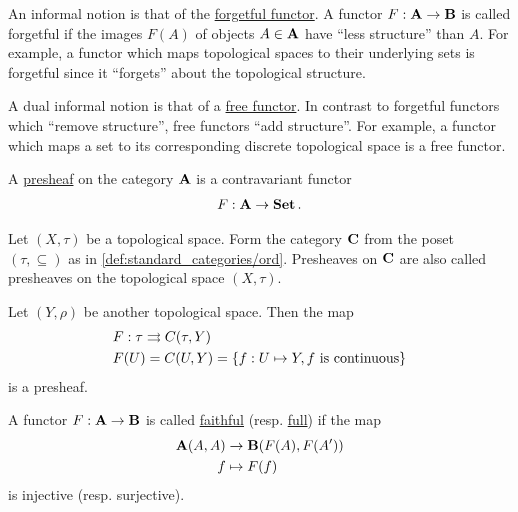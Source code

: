 \begin{note}\label{note:forgetful_free_functor}\cite[examples 1.2.3, 1.2.4]{Leinster2014}
  An informal notion is that of the \uline{forgetful functor}. A functor $F: \operatorname{\mathbf{A}} \to \operatorname{\mathbf{B}}$ is called forgetful if the images $F(A)$ of objects $A \in \operatorname{\mathbf{A}}$ have \enquote{less structure} than $A$. For example, a functor which maps topological spaces to their underlying sets is forgetful since it \enquote{forgets} about the topological structure.

  A dual informal notion is that of a \uline{free functor}. In contrast to forgetful functors which \enquote{remove structure}, free functors \enquote{add structure}. For example, a functor which maps a set to its corresponding discrete topological space is a free functor.
\end{note}

\begin{definition}\label{def:presheaf}\cite[definition 1.2.15]{Leinster2014}
  A \uline{presheaf} on the category $\operatorname{\mathbf{A}}$ is a contravariant functor
  \begin{align*}
    F: \operatorname{\mathbf{A}} \to \operatorname{\mathbf{Set}}.
  \end{align*}
\end{definition}

\begin{example}\label{ex:topological_space_presheaf}\cite[24]{Leinster2014}
  Let $(X, \tau)$ be a topological space. Form the category $\operatorname{\mathbf{C}}$ from the poset $(\tau, \subseteq)$ as in \cref{def:standard_categories/ord}. Presheaves on $\operatorname{\mathbf{C}}$ are also called presheaves on the topological space $(X, \tau)$.

  Let $(Y, \rho)$ be another topological space. Then the map
  \begin{align*}
    &F: \tau \rightrightarrows C(\tau, Y) \\
    &F(U) = C(U, Y) = \{ f: U \mapsto Y, f \text{ is continuous} \}
  \end{align*}
  is a presheaf.
\end{example}

\begin{definition}\label{def:faithful_full_functors}\cite[definition 1.2.16]{Leinster2014}
  A functor $F: \operatorname{\mathbf{A}} \to \operatorname{\mathbf{B}}$ is called \uline{faithful} (resp. \uline{full}) if the map
  \begin{align*}
    \operatorname{\mathbf{A}}(A, A) &\to \operatorname{\mathbf{B}}(F(A), F(A')) \\
    f &\mapsto F(f)
  \end{align*}
  is injective (resp. surjective).
\end{definition}

